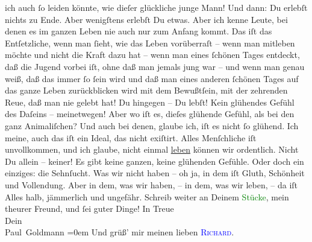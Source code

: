                ich auch ſo  leiden könnte, wie dieſer glückliche
               junge Mann! Und dann: Du erlebſt nichts zu Ende. Aber wenigſtens erlebſt Du etwas.
               Aber ich kenne {\pb}Leute, bei  denen es im ganzen Leben nie auch nur zum Anfang kommt. Das iſt das
               Entſetzliche, wenn man ſieht, wie das Leben vorüberraſt – wenn man mitleben möchte
               und nicht die Kraft dazu hat – wenn man eines ſchönen Tages  entdeckt, daß die Jugend vorbei iſt, ohne daß man jemals jung war – und
               wenn man genau weiß, daß das immer ſo ſein wird und daß man eines  anderen ſchönen Tages auf das {\pb}ganze Leben zurückblicken wird mit dem Bewußtſein,
               mit der zehrenden Reue, daß man nie gelebt hat! Du hingegen – Du lebſt! Kein
               glühendes Gefühl des Daſeins – meinetwegen! Aber wo iſt es, dieſes glühende Gefühl,
               als bei den ganz Animaliſchen? Und auch bei denen, glaube ich, iſt es nicht ſo
               glühend. Ich meine, auch das iſt ein Ideal, das nicht exiſtirt. Alles Menſchliche iſt
                   unvollkommen, und ich glaube, nicht einmal {\pb}\uline{leben} können wir ordentlich. Nicht Du allein –
               keiner! Es gibt keine ganzen, keine glühenden Gefühle. Oder doch\strikeout{,} ein einziges: die Sehnſucht. Was wir nicht haben – oh
               ja, in dem iſt Gluth, Schönheit und Vollendung. Aber in dem, was wir haben, – in dem,
               was wir leben, – da iſt Alles halb, jämmerlich und ungefähr.\pend
           \pstart
           {\pb}Schreib weiter an Deinem \textcolor{green}{Stücke}{}, mein theurer Freund,
               und ſei guter Dinge!\pend
           \pstart
           In Treue {\\[\baselineskip]}Dein {\\[\baselineskip]}\spacefill\mbox{Paul Goldmann}\pend
           \leftskip=0em{}\pstart
           \noindent{}Und grüß’ mir meinen lieben \textsc{\textcolor{blue}{Richard}{}\ledrightnote{\textcolor{blue}{Richard Beer-Hofmann}}}.\pend
           \endnumbering{}  
      